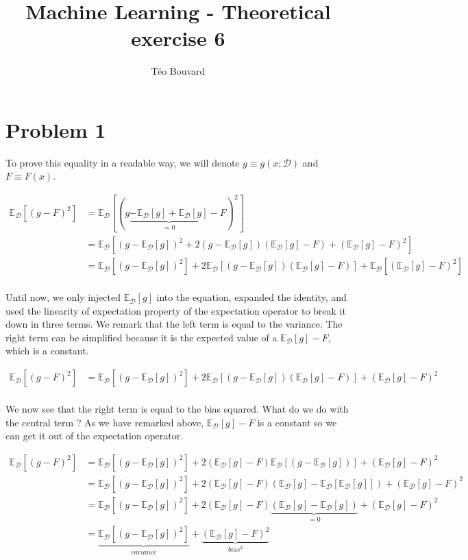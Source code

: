 \documentclass[a4paper, 10pt, twoside]{article}
\begin{document}
\title{Machine Learning - Theoretical exercise 6}
\author{T\'eo Bouvard}
\maketitle

\section*{Problem 1}

\newcommand{\ED}[1]{\mathbb{E}_\mathcal{D}\left[#1\right]}

To prove this equality in a readable way, we will denote $g \equiv g\left(x;\mathcal{D}\right)$ and $F \equiv F(x)$.

\begin{align*}
	\ED{(g-F)^2}
	 & = \ED{(g \underbrace{- \ED{g} + \ED{g}}_{= 0} - F)^2}                         \\
	 & = \ED{(g - \ED{g})^2 + 2 (g - \ED{g})(\ED{g} - F) + (\ED{g} - F)^2}           \\
	 & = \ED{(g - \ED{g})^2} + 2 \ED{(g - \ED{g})(\ED{g} - F)} + \ED{(\ED{g} - F)^2} \\
\end{align*}

Until now, we only injected $\ED{g}$ into the equation, expanded the identity, and used the linearity of expectation property of the expectation operator to break it down in three terms. We remark that the left term is equal to the variance. The right term can be simplified because it is the expected value of a $\ED{g} - F$, which is a constant.

\begin{align*}
	\ED{(g-F)^2} & = \ED{(g - \ED{g})^2} + 2 \ED{(g - \ED{g})(\ED{g} - F)} + (\ED{g} - F)^2 \\
\end{align*}

We now see that the right term is equal to the bias squared. What do we do with the central term ? As we have remarked above, $\ED{g} - F$ is a constant so we can get it out of the expectation operator.

\begin{align*}
	\ED{(g-F)^2}
	 & = \ED{(g - \ED{g})^2} + 2 (\ED{g} - F) \ED{(g - \ED{g})} + (\ED{g} - F)^2                   \\
	 & = \ED{(g - \ED{g})^2} + 2 (\ED{g} - F) (\ED{g} - \ED{\ED{g}}) + (\ED{g} - F)^2              \\
	 & = \ED{(g - \ED{g})^2} + 2 (\ED{g} - F) \underbrace{(\ED{g} - \ED{g})}_{=0} + (\ED{g} - F)^2 \\
	 & = \underbrace{\ED{(g - \ED{g})^2}}_{variance} + \underbrace{(\ED{g} - F)^2}_{bias^2}        \\
\end{align*}
\end{document}
